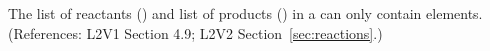 The list of reactants () and list of products
() in a \KineticLaw can only contain
 elements.  (References: L2V1 Section 4.9; L2V2
Section~\ref{sec:reactions}.)
